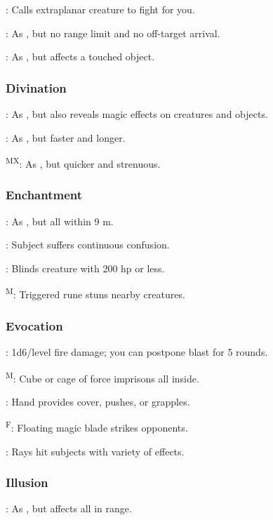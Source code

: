 	: Calls extraplanar creature to fight for you.

	: As , but no range limit and no off-target arrival.

	: As , but affects a touched object.

\subsubsection{Divination}
	: As , but also reveals magic effects on creatures and objects.

	: As , but faster and longer.

	\textsuperscript{MX}: As , but quicker and strenuous.

\subsubsection{Enchantment}
	: As , but all within 9 m.

	: Subject suffers continuous confusion.

	: Blinds creature with 200 hp or less.

	\textsuperscript{M}: Triggered rune stuns nearby creatures.

\subsubsection{Evocation}
	: 1d6/level fire damage; you can postpone blast for 5 rounds.

	\textsuperscript{M}: Cube or cage of force imprisons all inside.

	: Hand provides cover, pushes, or grapples.

	\textsuperscript{F}: Floating magic blade strikes opponents.

	: Rays hit subjects with variety of effects.

\subsubsection{Illusion}
	: As , but affects all in range.

